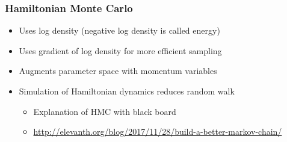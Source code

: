 \documentclass[10pt]{beamer}
\begin{document}
\begin{frame}
\end{frame}

\begin{frame}

\frametitle{Hamiltonian Monte Carlo}

  \begin{itemize}
  \item Uses log density (negative log density is called energy)
  \item Uses gradient of log density for more efficient sampling
  \item Augments parameter space with momentum variables
  \item Simulation of Hamiltonian dynamics reduces random walk
    \begin{itemize}
    \item Explanation of HMC with black board
    \item \url{http://elevanth.org/blog/2017/11/28/build-a-better-markov-chain/}
    \end{itemize}
  \end{itemize}

\end{frame}
\end{document}
